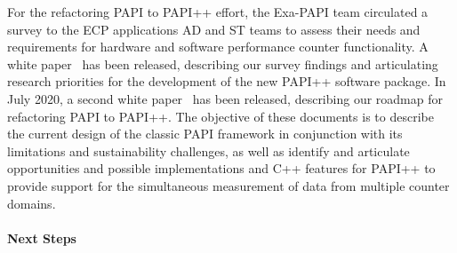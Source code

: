 For the refactoring PAPI to PAPI++ effort, the Exa-PAPI team circulated a survey to the ECP 
applications AD and ST teams to assess their needs and requirements 
for hardware and software performance counter functionality. A white paper~\cite{PWN-2020-01} has been released, 
describing our survey findings and articulating research priorities for the development of the new 
PAPI++ software package.
In July 2020, a second white paper~\cite{PWN-2020-07} has been released, describing our roadmap for 
refactoring PAPI to PAPI++. The objective of these documents is to describe the current design of the
classic PAPI framework in conjunction with its limitations and sustainability challenges, as well as identify 
and articulate opportunities and possible implementations and C++ features for PAPI++ to provide support 
for the simultaneous measurement of data from multiple counter domains.



\paragraph{Next Steps}

